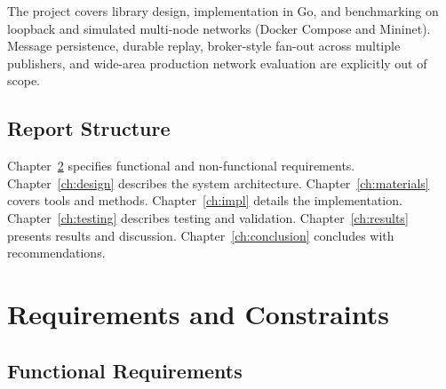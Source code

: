 \documentclass[12pt, a4paper, oneside]{report}
\begin{document}
The project covers library design, implementation in Go, and benchmarking on loopback and simulated multi-node networks (Docker Compose and Mininet). Message persistence, durable replay, broker-style fan-out across multiple publishers, and wide-area production network evaluation are explicitly out of scope.

\section{Report Structure}
\label{sec:structure}

Chapter~\ref{ch:reqs} specifies functional and non-functional requirements. Chapter~\ref{ch:design} describes the system architecture. Chapter~\ref{ch:materials} covers tools and methods. Chapter~\ref{ch:impl} details the implementation. Chapter~\ref{ch:testing} describes testing and validation. Chapter~\ref{ch:results} presents results and discussion. Chapter~\ref{ch:conclusion} concludes with recommendations.

\chapter{Requirements and Constraints}
\label{ch:reqs}

\section{Functional Requirements}
\label{sec:func-reqs}
\end{document}
